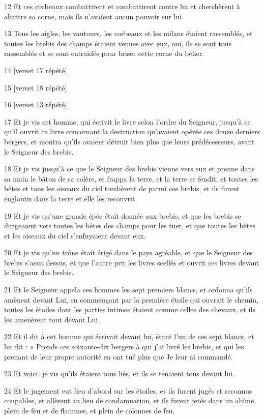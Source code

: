 \par 12 Et ces corbeaux combattirent et combattirent contre lui et cherchèrent à abattre sa corne, mais ils n'avaient aucun pouvoir sur lui.
\par 13 Tous les aigles, les vautours, les corbeaux et les milans étaient rassemblés, et toutes les brebis des champs étaient venues avec eux, oui, ils se sont tous rassemblés et se sont entraidés pour briser cette corne du bélier.
\par 14 [verset 17 répété]
\par 15 [verset 18 répété]
\par 16 [verset 13 répété]
\par 17 Et je vis cet homme, qui écrivit le livre selon l'ordre du Seigneur, jusqu'à ce qu'il ouvrit ce livre concernant la destruction qu'avaient opérée ces douze derniers bergers, et montra qu'ils avaient détruit bien plus que leurs prédécesseurs, avant le Seigneur des brebis.
\par 18 Et je vis jusqu'à ce que le Seigneur des brebis vienne vers eux et prenne dans sa main le bâton de sa colère, et frappa la terre, et la terre se fendit, et toutes les bêtes et tous les oiseaux du ciel tombèrent de parmi ces brebis, et ils furent engloutis dans la terre et elle les recouvrit.
\par 19 Et je vis qu'une grande épée était donnée aux brebis, et que les brebis se dirigeaient vers toutes les bêtes des champs pour les tuer, et que toutes les bêtes et les oiseaux du ciel s'enfuyaient devant eux.
\par 20 Et je vis qu'un trône était érigé dans le pays agréable, et que le Seigneur des brebis s'assit dessus, et que l'autre prit les livres scellés et ouvrit ces livres devant le Seigneur des brebis.
\par 21 Et le Seigneur appela ces hommes les sept premiers blancs, et ordonna qu'ils amènent devant Lui, en commençant par la première étoile qui ouvrait le chemin, toutes les étoiles dont les parties intimes étaient comme celles des chevaux, et ils les amenèrent tout devant Lui.
\par 22 Et il dit à cet homme qui écrivait devant lui, étant l'un de ces sept blancs, et lui dit : « Prends ces soixante-dix bergers à qui j'ai livré les brebis, et qui les prenant de leur propre autorité en ont tué plus que Je leur ai commandé.
\par 23 Et voici, je vis qu'ils étaient tous liés, et ils se tenaient tous devant lui.
\par 24 Et le jugement eut lieu d'abord sur les étoiles, et ils furent jugés et reconnus coupables, et allèrent au lieu de condamnation, et ils furent jetés dans un abîme, plein de feu et de flammes, et plein de colonnes de feu.
